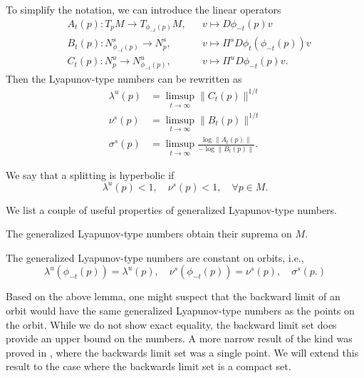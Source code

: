 To simplify the notation, we can introduce the linear operators
\begin{align}
	&A_t(p) : T_pM \to T_{\phi_{-t}(p)} M, & &v\mapsto D\phi_{-t}(p) v \\
	&B_t(p) : N^s_{\phi_{-t}(p)} \to N^s_p, & &v\mapsto \Pi^s D\phi_t(\phi_{-t}(p)) v \\
	&C_t(p) : N^u_p \to N^u_{\phi_{-t}(p)}, & &v\mapsto \Pi^u D\phi_{-t}(p) v.
\end{align}
Then the Lyapunov-type numbers can be rewritten as 
\begin{align}
	\lambda^u(p) &= \limsup_{t\to\infty} \|C_t(p) \| ^{1/t} \\
	\nu^s(p) &= \limsup_{t\to\infty} \| B_t(p)\|^{1/t} \\
	\sigma^s(p) &= \limsup_{t\to\infty} \frac{ \log \| A_t(p) \|}{-\log\| B_t(p) \|}.
\end{align}

We say that a splitting is hyperbolic if 
\begin{equation}
	\lambda^u(p) < 1, \quad \nu^s(p) < 1, \quad \forall p \in M.
\end{equation}

We list a couple of useful properties of generalized Lyapunov-type numbers.
\begin{lem}\cite[Lem.~4.1.1]{wiggins1994normally}
	The generalized Lyapunov-type numbers obtain their suprema on \(M\).
\end{lem}
\begin{lem}\cite[Lem.~3.1.2]{wiggins1994normally}
	The generalized Lyapunov-type numbers are constant on orbits, i.e., 
	\begin{equation}
		\lambda^u(\phi_{-t}(p)) = \lambda^u(p), \quad \nu^s(\phi_{-t}(p)) = \nu^s(p), \quad \sigma^s(p.)
	\end{equation}
\end{lem}

Based on the above lemma, one might suspect that the backward limit of an orbit would have the same generalized Lyapunov-type numbers as the points on the orbit. While we do not show exact equality, the backward limit set does provide an upper bound on the numbers. A more narrow result of the kind was proved in \cite[Thm.~2.3]{dieci1997lyapunov}, where the backwards limit set was a single point. We will extend this result to the case where the backwards limit set is a compact set.

